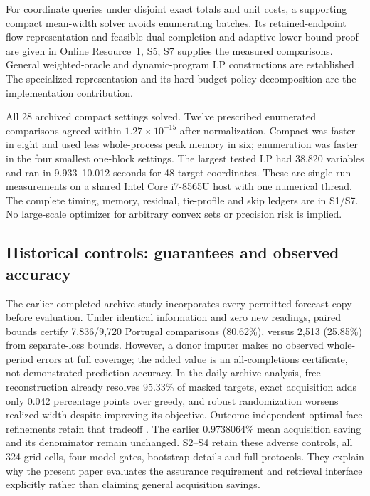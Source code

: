\documentclass[12pt]{article}
\begin{document}
For coordinate queries under disjoint exact totals and unit costs, a
supporting compact mean-width solver avoids enumerating batches.
Its retained-endpoint flow representation and feasible dual completion
and adaptive lower-bound proof are given in Online Resource~1, S5;
S7 supplies the measured comparisons. General weighted-oracle
and dynamic-program LP constructions are established
\citep{kawase2024,martin1990}. The specialized representation and its
hard-budget policy decomposition are the implementation contribution.

All 28 archived compact settings solved. Twelve prescribed enumerated
comparisons agreed within $1.27\times10^{-15}$ after normalization.
Compact was faster in eight and used less whole-process peak memory in
six; enumeration was faster in the four smallest one-block settings.
The largest tested LP had 38,820 variables and ran in 9.933--10.012 seconds
for 48 target coordinates. These are single-run measurements on a shared
Intel Core i7-8565U host with one numerical thread. The complete timing,
memory, residual, tie-profile and skip ledgers are in S1/S7.
No large-scale optimizer for arbitrary convex sets or precision risk is implied.
\subsection{Historical controls: guarantees and observed accuracy}
\label{sec:historical-application}
The earlier completed-archive study \citep{portugal,uci} incorporates every permitted forecast
copy before evaluation. Under identical information and zero new readings,
paired bounds certify 7,836/9,720 Portugal comparisons (80.62\%), versus
2,513 (25.85\%) from separate-loss bounds. However, a donor imputer makes
no observed whole-period errors at full coverage; the added value is an
all-completions certificate, not demonstrated prediction accuracy.
In the daily archive analysis, free reconstruction already resolves 95.33\%
of masked targets, exact acquisition adds only 0.042 percentage points over
greedy, and robust randomization worsens realized width despite improving
its objective. Outcome-independent optimal-face refinements retain that
tradeoff \citep{iancu2014}. The earlier 0.9738064\% mean acquisition saving
and its denominator remain unchanged. S2--S4 retain these adverse controls,
all 324 grid cells, four-model gates, bootstrap details and full protocols.
They explain why the present paper evaluates the assurance requirement and
retrieval interface explicitly rather than claiming general acquisition savings.
\end{document}
